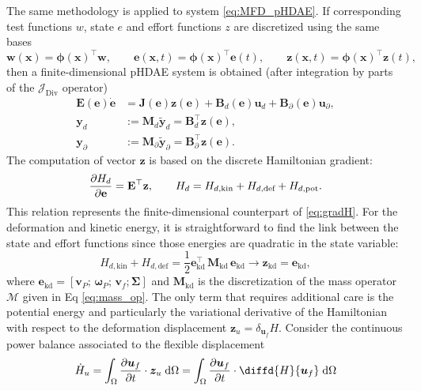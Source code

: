 \documentclass{svjour3}                     %
\DeclareMathOperator*{\Div}{Div}
\begin{document}
	The same methodology is applied to system \eqref{eq:MFD_pHDAE}. If corresponding test functions $w$, state $e$ and effort functions $z$ are discretized using the same bases
	\[ \bm{w}(\bm{x}) = \bm{\phi}(\bm{x})^\top \mathbf{w}, \qquad \bm{e}(\bm{x}, t) = \bm{\phi}(\bm{x})^\top \mathbf{e}(t), \qquad \bm{z}(\bm{x}, t) = \bm{\phi}(\bm{x})^\top \mathbf{z}(t),
	\]
	then a finite-dimensional pHDAE system is obtained (after integration by parts of the $\mathcal{J}_{\Div}$ operator)
	\begin{equation}
	\begin{aligned}
	\mathbf{E}(\mathbf{e}) \dot{\mathbf{e}} &= \mathbf{J}(\mathbf{e}) \mathbf{z}(\mathbf{e}) + \mathbf{B}_d(\mathbf{e}) \mathbf{u}_d + \mathbf{B}_\partial(\mathbf{e}) \mathbf{u}_\partial, \\
	\mathbf{y}_d &:= \mathbf{M}_d \widetilde{\mathbf{y}}_d = \mathbf{B}_d^\top \mathbf{z}(\mathbf{e}),  \\
	\mathbf{y}_\partial &:= \mathbf{M}_\partial \widetilde{\mathbf{y}}_\partial = \mathbf{B}_\partial^\top \mathbf{z}(\mathbf{e}).
	\end{aligned}
	\end{equation}
	The computation of vector $\mathbf{z}$ is based on the discrete Hamiltonian  gradient:
	\[
	\diffp{H_d}{\mathbf{e}} = \mathbf{E}^\top \mathbf{z}, \qquad H_d = H_{d, \text{kin}}+H_{d, \text{def}}+H_{d, \text{pot}}.
	\]
	This relation represents the finite-dimensional counterpart of \eqref{eq:gradH}. For the deformation and kinetic energy, it is straightforward to find the link between the state and effort functions since those energies are quadratic in the state variable:
	\begin{equation}
	H_{d, \text{kin}} + H_{d, \text{def}} = \frac{1}{2} \mathbf{e}_{\text{kd}}^\top \, \mathbf{M}_{\text{kd}} \, \mathbf{e}_{\text{kd}} \longrightarrow \mathbf{z}_{\text{kd}} = \mathbf{e}_{\text{kd}},
	\end{equation}
	where $\mathbf{e}_{\text{kd}} = [\mathbf{v}_P; \, \bm{\omega}_P; \, \mathbf{v}_f; \bm{\Sigma}]$ and $\mathbf{M}_{\text{kd}}$ is the discretization of the mass operator $\bm{\mathcal{M}}$ given in Eq \eqref{eq:mass_op}.
	The only term that requires additional care is the potential energy and particularly the variational derivative of the Hamiltonian with respect to the deformation displacement $\bm{z}_{u}=\delta_{\bm{u}_f} H$.  Consider the continuous power balance associated to the flexible displacement
	\[
	\dot{H}_u = \int_{\Omega} \diffp{\bm{u}_f}{t} \cdot \bm{z}_{u} \d{\Omega} = \int_{\Omega} \diffp{\bm{u}_f}{t} \cdot \diffd{H}{\bm{u}_f} \d{\Omega}
	\]
\end{document}

